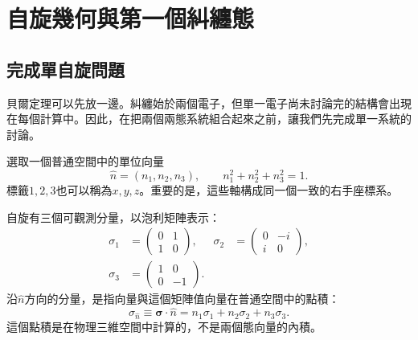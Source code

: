 \chapter{自旋幾何與第一個糾纏態}


\section{完成單自旋問題}

貝爾定理可以先放一邊。糾纏始於兩個電子，但單一電子尚未討論完的結構會出現在每個計算中。因此，在把兩個兩態系統組合起來之前，讓我們先完成單一系統的討論。

選取一個普通空間中的單位向量
\begin{equation}
  \hat n=(n_1,n_2,n_3),
  \qquad
  n_1^2+n_2^2+n_3^2=1.
  \label{eq:l04-unit-pointer}
\end{equation}
標籤\(1,2,3\)也可以稱為\(x,y,z\)。重要的是，這些軸構成同一個一致的右手座標系。

\begin{classroomqa}
\end{classroomqa}

自旋有三個可觀測分量，以泡利矩陣表示：
\begin{equation}
  \begin{aligned}
    \sigma_1&=
    \begin{pmatrix}0&1\\1&0\end{pmatrix},
    &
    \sigma_2&=
    \begin{pmatrix}0&-i\\i&0\end{pmatrix},\\[0.5em]
    \sigma_3&=
    \begin{pmatrix}1&0\\0&-1\end{pmatrix}.
  \end{aligned}
\end{equation}
沿\(\hat n\)方向的分量，是指向量與這個矩陣值向量在普通空間中的點積：
\begin{equation}
  \sigma_{\hat n}
  \equiv
  \boldsymbol{\sigma}\cdot\hat n
  =
  n_1\sigma_1+n_2\sigma_2+n_3\sigma_3.
  \label{eq:l04-sigma-dot-n}
\end{equation}
這個點積是在物理三維空間中計算的，不是兩個態向量的內積。

